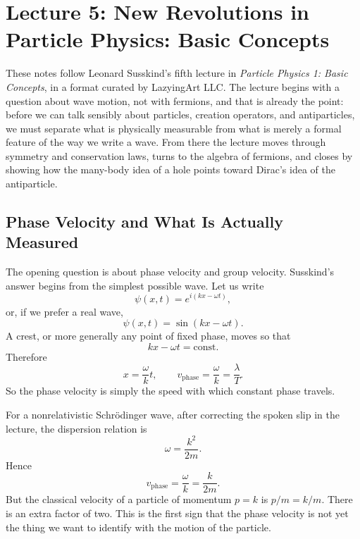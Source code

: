 \chapter{Lecture 5: New Revolutions in Particle Physics: Basic Concepts}

These notes follow Leonard Susskind's fifth lecture in \emph{Particle Physics 1: Basic Concepts}, in a format curated by LazyingArt LLC. The lecture begins with a question about wave motion, not with fermions, and that is already the point: before we can talk sensibly about particles, creation operators, and antiparticles, we must separate what is physically measurable from what is merely a formal feature of the way we write a wave. From there the lecture moves through symmetry and conservation laws, turns to the algebra of fermions, and closes by showing how the many-body idea of a hole points toward Dirac's idea of the antiparticle.

\section{Phase Velocity and What Is Actually Measured}

The opening question is about phase velocity and group velocity. Susskind's answer begins from the simplest possible wave. Let us write
\begin{equation}
\psi(x,t)=e^{i(kx-\omega t)},
\end{equation}
or, if we prefer a real wave,
\begin{equation}
\psi(x,t)=\sin(kx-\omega t).
\end{equation}
A crest, or more generally any point of fixed phase, moves so that
\begin{equation}
kx-\omega t=\text{const.}
\end{equation}
Therefore
\begin{equation}
x=\frac{\omega}{k}t,
\qquad
v_{\mathrm{phase}}=\frac{\omega}{k}=\frac{\lambda}{T}.
\end{equation}
So the phase velocity is simply the speed with which constant phase travels.

For a nonrelativistic Schr\"odinger wave, after correcting the spoken slip in the lecture, the dispersion relation is
\begin{equation}
\omega=\frac{k^2}{2m}.
\end{equation}
Hence
\begin{equation}
v_{\mathrm{phase}}=\frac{\omega}{k}=\frac{k}{2m}.
\end{equation}
But the classical velocity of a particle of momentum \(p=k\) is \(p/m=k/m\). There is an extra factor of two. This is the first sign that the phase velocity is not yet the thing we want to identify with the motion of the particle.

